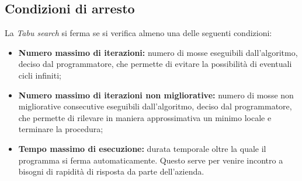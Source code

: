 \subsection{Condizioni di arresto}
\label{sec:condizioni-arresto}
\noindent La \textit{Tabu search} si ferma se si verifica almeno una delle seguenti condizioni:
\begin{itemize}
    \item \textbf{Numero massimo di iterazioni:} numero di mosse eseguibili dall'algoritmo, deciso
    dal programmatore, che permette di evitare la possibilità di eventuali cicli infiniti;
    \item \textbf{Numero massimo di iterazioni non migliorative:} numero di mosse non migliorative
    consecutive eseguibili dall'algoritmo, deciso dal programmatore, che permette
    di rilevare in maniera approssimativa un minimo
    locale e terminare la procedura;
    \item \textbf{Tempo massimo di esecuzione:}  durata temporale oltre
    la quale il programma si ferma automaticamente. Questo serve per venire incontro a
    bisogni di rapidità di risposta da parte dell’azienda.
    
\end{itemize}
